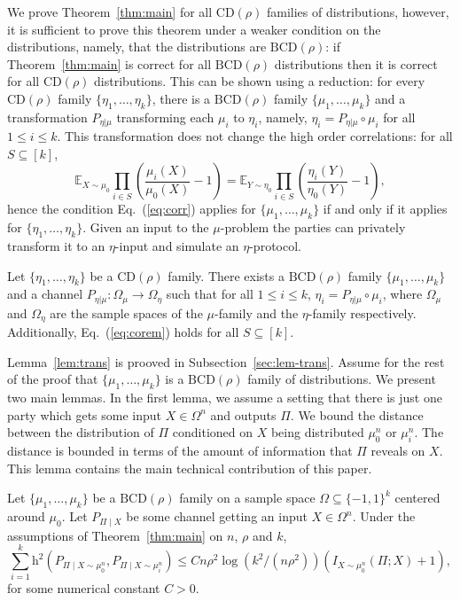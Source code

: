 \documentclass[final, 12pt]{colt2018}
\providecommand{\helli}{\mathrm{h}}
\providecommand{\CD}{\mathrm{CD}}
\providecommand{\BCD}{\mathrm{BCD}}
\newcommand{\subsecref}[1]{Subsection~\ref{#1}}
\renewcommand{\eqref}[1]{Eq.~(\ref{#1})}
\newcommand{\lemref}[1]{Lemma~\ref{#1}}
\begin{document}
We prove Theorem~\ref{thm:main} for all $\CD(\rho)$ families of distributions, however, it is sufficient to prove this theorem under a weaker condition on the distributions, namely, that the distributions are $\BCD(\rho)$: if Theorem~\ref{thm:main} is correct for all $\BCD(\rho)$ distributions then it is correct for all $\CD(\rho)$ distributions. This can be shown using a reduction: for every $\CD(\rho)$ family $\{\eta_1, \dots, \eta_k\}$,  there is a $\BCD(\rho)$ family $\{ \mu_1, \dots, \mu_k \}$ and a transformation $P_{\eta | \mu}$ transforming each $\mu_i$ to $\eta_i$, namely, $\eta_i = P_{\eta | \mu} \circ \mu_i$ for all $1 \le i \le k$. This transformation does not change the high order correlations: for all $S \subseteq [k]$, 
\begin{equation} \label{eq:corem}
\mathbb{E}_{X \sim \mu_0} \prod_{i \in S} \left(\frac{\mu_i(X)}{\mu_0(X)}-1\right) = \mathbb{E}_{Y \sim \eta_0} \prod_{i \in S} \left( \frac{\eta_i(Y)}{\eta_0(Y)}-1 \right),
\end{equation}
hence the condition \eqref{eq:corr} applies for $\{ \mu_1, \dots, \mu_k \}$ if and only if it applies for $\{ \eta_1, \dots, \eta_k \}$.
Given an input to the $\mu$-problem the parties can privately transform it to an $\eta$-input and simulate an $\eta$-protocol.

\begin{lemma} \label{lem:trans}
Let $\{ \eta_1, \dots, \eta_k \}$ be a $\CD(\rho)$ family. There exists a $\BCD(\rho)$ family $\{\mu_1, \dots, \mu_k \}$ and a channel $P_{\eta | \mu} \colon \Omega_\mu \to \Omega_\eta$ such that for all $1 \le i \le k$, $\eta_i = P_{\eta|\mu} \circ \mu_i$, where $\Omega_\mu$ and $\Omega_\eta$ are the sample spaces of the $\mu$-family and the $\eta$-family respectively. Additionally, \eqref{eq:corem} holds for all $S \subseteq [k]$.
\end{lemma}

\lemref{lem:trans} is prooved in \subsecref{sec:lem-trans}.
Assume for the rest of the proof that $\{\mu_1, \dots, \mu_k\}$ is a $\BCD(\rho)$ family of distributions.
We present two main lemmas.
In the first lemma, we assume a setting that there is just one party which gets some input $X \in \Omega^n$ and outputs $\Pi$. We bound the distance between the distribution of $\Pi$ conditioned on $X$ being distributed $\mu_0^n$ or $\mu_i^n$. The distance is bounded in terms of the amount of information that $\Pi$ reveals on $X$. This lemma contains the main technical contribution of this paper.

\begin{lemma} \label{lem:main}
Let $\{ \mu_1, \dots, \mu_k \}$ be a $\BCD(\rho)$ family on a sample space $\Omega \subseteq \{-1,1\}^k$ centered around $\mu_0$. Let $P_{\Pi \mid X}$ be some channel getting an input $X \in \Omega^n$. Under the assumptions of Theorem~\ref{thm:main} on $n$, $\rho$ and $k$,
\[
\sum_{i=1}^k \helli^2(P_{\Pi \mid X\sim \mu_0^n}, P_{\Pi \mid X \sim \mu_i^n})
\le C n \rho^2 \log(k^2/(n\rho^2))(I_{X \sim \mu_0^n}(\Pi ; X) + 1),
\]
for some numerical constant $C>0$.
\end{lemma}
\end{document}

